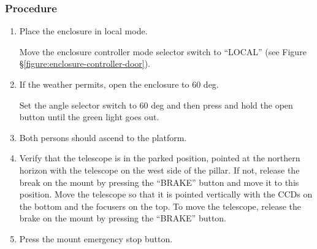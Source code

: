 \subsubsection{Procedure}

\begin{enumerate}

\item
Place the enclosure in local mode.

Move the enclosure controller mode selector switch to “LOCAL” (see Figure \S\ref{figure:enclosure-controller-door}).
\item
If the weather permits, open the enclosure to 60 deg.

Set the angle selector switch to 60 deg and then press and hold the open button until the green light goes out.

\item
Both persons should ascend to the platform.

\item
\ifcoatlioan
Verify that the telescope is in the parked position, pointed at the northern horizon with the telescope on the west side of the pillar. If not, release the break on the mount by pressing the “BRAKE” button and move it to this position.
\fi
\ifddotioan
Move the telescope so that it is pointed vertically with the CCDs on the bottom and the focusers on the top. To move the telescope, release the brake on the mount by pressing the “BRAKE” button.
\fi

\item
Press the mount emergency stop button.


\end{enumerate}
